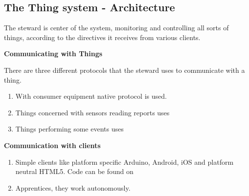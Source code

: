 \documentclass[16pt]{article}
\begin{document}
\subsection{The Thing system - Architecture}


\vspace{0.5cm}

The steward is center of the system, monitoring and controlling all
sorts of things, according to the directives it receives from various
clients.
\vspace{0.5cm}

{\Large{\textbf{Communicating with
Things}}}


There are three different protocols that the steward uses to communicate
with a thing. 

\begin{enumerate}


\item With consumer equipment native protocol is used.
\item Things concerned with sensors reading reports uses
\item Things performing some events uses

\end{enumerate}

\vspace{0.5cm}

{\Large{\textbf{Communication with
clients}}}


\begin{enumerate}


\item
  Simple clients like platform specific Arduino, Android, iOS and
  platform neutral HTML5. Code can be found on
\item
  Apprentices, they work autonomously.
  
\end{enumerate}
\end{document}
